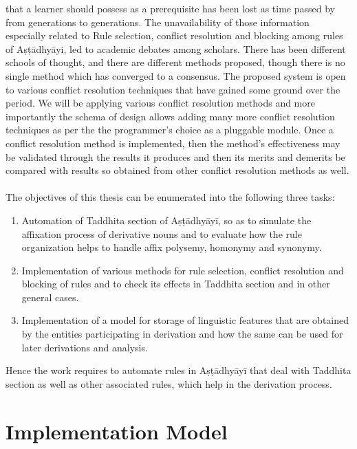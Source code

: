 \documentclass[a4paper,11pt,twoside,openright]{report}
\begin{document}
that a learner should possess as a prerequisite has been lost as time passed by from generations
to generations. The unavailability of those information especially related to Rule selection, conflict resolution and blocking among rules of Aṣṭādhyāyi, led to academic debates among
scholars. There has been different schools of thought, and there are different methods proposed, though there is no single method which has converged to a consensus. The proposed system 
is open to various conflict resolution techniques that have gained some ground over
the period. We will be applying various conflict resolution methods and more importantly
the schema of design allows adding many more conflict resolution techniques as per the
the programmer's choice as a pluggable module. Once a conflict resolution method is implemented, then the method's effectiveness may be validated through the results it produces and then its merits
and demerits be compared with results so obtained from other conflict resolution methods
as well.
\\ \\
The objectives of this thesis can be enumerated into the following three tasks:
\renewcommand{\labelenumi}{$\Roman{enumi}$}
\begin{enumerate}
\item Automation of Taddhita section of Aṣṭādhyāyī, so as to simulate the affixation process of derivative nouns and to evaluate how the rule organization helps to handle affix polysemy, homonymy and synonymy.

\item Implementation of various methods for rule selection, conflict resolution and blocking of rules and to check its effects in Taddhita section and in other general cases.

\item Implementation of a  model for storage of linguistic features that are obtained by the entities participating in derivation and how the same can be used for later derivations and analysis. 

\end{enumerate}

Hence the work requires to automate rules in Aṣṭādhyāyī that deal with Taddhita section as well as other associated rules, which help in the derivation process.

\section{Implementation Model}
\end{document}
